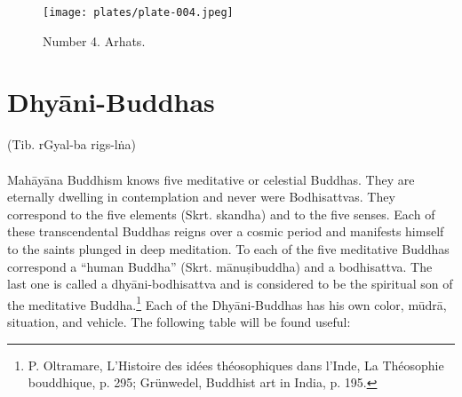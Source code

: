 \documentclass[a4paper, 12pt, oneside]{article}
\begin{document}
\clearpage
\begin{figure}[H]
\centering
\texttt{[image: plates/plate-004.jpeg]}
\caption*{Number 4. Arhats.}
\end{figure}
\clearpage
\section{Dhy\={a}ni-Buddhas}
\begin{center}
(Tib. rGyal-ba rigs-l\.{n}a)
\end{center}
\paragraph{}
Mah\={a}y\={a}na Buddhism knows five meditative or celestial Buddhas. They are eternally dwelling in contemplation and never were Bodhisattvas. They correspond to the five elements (Skrt. skandha) and to the five senses. Each of these transcendental Buddhas reigns over a cosmic period and manifests himself to the saints plunged in deep meditation. To each of the five meditative Buddhas correspond a ``human Buddha'' (Skrt. m\={a}nu\d{s}ibuddha) and a bodhisattva. The last one is called a dhy\={a}ni-bodhisattva and is considered to be the spiritual son of the meditative Buddha.\footnote{P. Oltramare, L'Histoire des idées théosophiques dans l'Inde, La Théosophie bouddhique, p. 295; Grünwedel, Buddhist art in India, p. 195.} Each of the Dhy\={a}ni-Buddhas has his own color, m\={u}dr\={a}, situation, and vehicle. The following table will be found useful:
\end{document}
